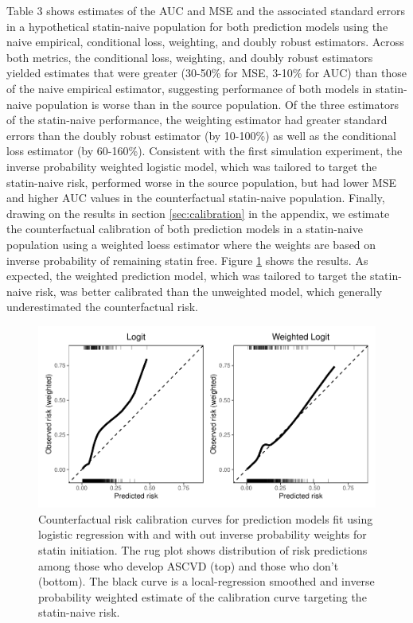 Table 3 shows estimates of the AUC and MSE and the associated standard errors in a hypothetical statin-naive population for both prediction models using the naive empirical, conditional loss, weighting, and doubly robust estimators. Across both metrics, the conditional loss, weighting, and doubly robust estimators yielded estimates that were greater (30-50\% for MSE, 3-10\% for AUC) than those of the naive empirical estimator, suggesting performance of both models in statin-naive population is worse than in the source population. Of the three estimators of the statin-naive performance, the weighting estimator had greater standard errors than the doubly robust estimator (by 10-100\%) as well as the conditional loss estimator (by 60-160\%). Consistent with the first simulation experiment, the inverse probability weighted logistic model, which was tailored to target the statin-naive risk, performed worse in the source population, but had lower MSE and higher AUC values in the counterfactual statin-naive population. Finally, drawing on the results in section \ref{sec:calibration} in the appendix, we estimate the counterfactual calibration of both prediction models in a statin-naive population using a weighted loess estimator where the weights are based on inverse probability of remaining statin free. Figure \ref{fig:calib} shows the results. As expected, the weighted prediction model, which was tailored to target the statin-naive risk, was better calibrated than the unweighted model, which generally underestimated the counterfactual risk.

\begin{figure}[p]
    \centering
    \includegraphics{../3_figures/calib.pdf}
    \caption{Counterfactual risk calibration curves for prediction models fit using logistic regression with and with out inverse probability weights for statin initiation. The rug plot shows distribution of risk predictions among those who develop ASCVD (top) and those who don't (bottom). The black curve is a local-regression smoothed and inverse probability weighted estimate of the calibration curve targeting the statin-naive risk.\label{fig:calib}}
\end{figure}

